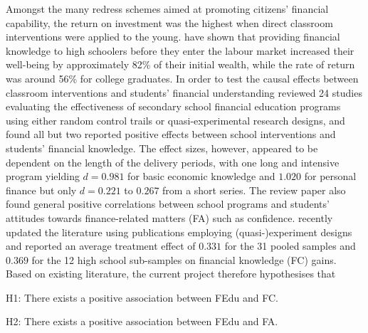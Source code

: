 Amongst the many redress schemes aimed at promoting citizens' financial capability, the return on investment was the highest when direct classroom interventions were applied to the young. \textcite{lusardi:2014} have shown that providing financial knowledge to high schoolers before they enter the labour market increased their well-being by approximately 82\% of their initial wealth, while the rate of return was around 56\% for college graduates. In order to test the causal effects between classroom interventions and students' financial understanding \textcite{amagir:2018} reviewed 24 studies evaluating the effectiveness of secondary school financial education programs using either random control trails or quasi-experimental research designs, and found all but two reported positive effects between school interventions and students' financial knowledge. The effect sizes, however, appeared to be dependent on the length of the delivery periods, with one long and intensive program yielding $d=0.981$ for basic economic knowledge and $1.020$ for personal finance but only $d=0.221$ to $0.267$ from a short series. The review paper also found general positive correlations between school programs and students' attitudes towards finance-related matters (FA) such as confidence. \textcite{kaiser:2020} recently updated the literature using publications employing (quasi-)experiment designs and reported an average treatment effect of $0.331$ for the 31 pooled samples and $0.369$ for the 12 high school sub-samples on financial knowledge (FC) gains. Based on existing literature, the current project therefore hypothesises that
\begin{MAEitemize}
    \item[H1:] There exists a positive association between FEdu and FC.
    \item[H2:] There exists a positive association between FEdu and FA.
\end{MAEitemize}

